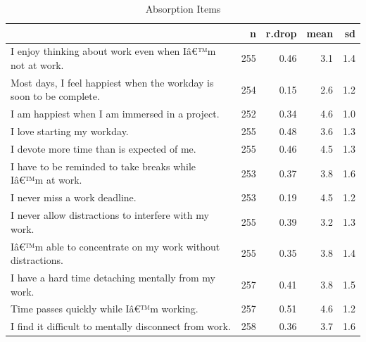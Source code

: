 \documentclass[
]{book}
\begin{document}
\begin{table}

\caption{\label{tab:rdrop4}Absorption Items}
\centering
\begin{tabular}[t]{l|r|r|r|r}
\hline
  & n & r.drop & mean & sd\\
\hline
I enjoy thinking about work even when Iâ€™m not at work. & 255 & 0.46 & 3.1 & 1.4\\
\hline
Most days, I feel happiest when the workday is soon to be complete. & 254 & 0.15 & 2.6 & 1.2\\
\hline
I am happiest when I am immersed in a project. & 252 & 0.34 & 4.6 & 1.0\\
\hline
I love starting my workday. & 255 & 0.48 & 3.6 & 1.3\\
\hline
I devote more time than is expected of me. & 255 & 0.46 & 4.5 & 1.3\\
\hline
I have to be reminded to take breaks while Iâ€™m at work. & 253 & 0.37 & 3.8 & 1.6\\
\hline
I never miss a work deadline. & 253 & 0.19 & 4.5 & 1.2\\
\hline
I never allow distractions to interfere with my work. & 255 & 0.39 & 3.2 & 1.3\\
\hline
Iâ€™m able to concentrate on my work without distractions. & 255 & 0.35 & 3.8 & 1.4\\
\hline
I have a hard time detaching mentally from my work. & 257 & 0.41 & 3.8 & 1.5\\
\hline
Time passes quickly while Iâ€™m working. & 257 & 0.51 & 4.6 & 1.2\\
\hline
I find it difficult to mentally disconnect from work. & 258 & 0.36 & 3.7 & 1.6\\
\hline
\end{tabular}
\end{table}
\end{document}
